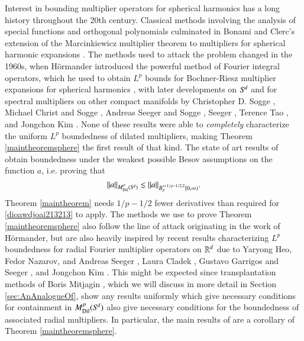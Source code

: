 Interest in bounding multiplier operators for spherical harmonics has a long history throughout the 20th century. Classical methods involving the analysis of special functions and orthogonal polynomials culminated in Bonami and Clerc's extension of the Marcinkiewicz multiplier theorem to multipliers for spherical harmonic expansions \cite{BonamiClerc}. The methods used to attack the problem changed in the 1960s, when H\"{o}rmander introduced the powerful method of Fourier integral operators, which he used to obtain $L^p$ bounds for Bochner-Riesz multiplier expansions for spherical harmonics \cite{HormanderRiesz}, with later developments on ${S}^{\!{d}}$ and for spectral multipliers on other compact manifolds by Christopher D. Sogge \cite{SoggeSpectralClusters,SoggeRieszMeans,SoggeSphericalHarmonics}, Michael Christ and Sogge \cite{ChristandSogge}, Andreas Seeger and Sogge \cite{SeegerSoggeBochnerRiesz}, Seeger \cite{SeegerEndpointEstimatesMultipliers}, Terence Tao \cite{Tao}, and Jongchon Kim \cite{KimSpectral}. None of these results were able to \emph{completely} characterize the uniform $L^p$ boundedness of dilated multipliers, making Theorem \ref{maintheoremsphere} the first result of that kind. The state of art results of \cite{KimSpectral} obtain boundedness under the weakest possible Besov assumptions on the function $a$, i.e. proving that
%
\begin{equation} \label{dioawdjoai213213}
  \| a \|_{M^p_{\text{Dil}}({S}^{\!{d}})} \lesssim \| a \|_{\dot{B}^{s+1/p - 1/2,2}_p[0,\infty)}.
\end{equation}
%
Theorem \ref{maintheorem} needs $1/p - 1/2$ fewer derivatives than required for \eqref{dioawdjoai213213} to apply. The methods we use to prove Theorem \ref{maintheoremsphere} also follow the line of attack originating in the work of H\"{o}rmander, but are also heavily inspired by recent results characterizing $L^p$ boundedness for radial Fourier multiplier operators on $\operatorname{\mathbb{R}}^d$ due to Yaryong Heo, Fedor Nazarov, and Andreas Seeger \cite{HeoandNazarovandSeeger2}, Laura Cladek \cite{Cladek}, Gustavo Garrigos and Seeger \cite{GarrigosandSeeger}, and Jongchon Kim \cite{KimQuasiradial}. This might be expected since transplantation methods of Boris Mitjagin \cite{Mitjagin}, which we will discuss in more detail in Section \ref{sec:AnAnalogueOf}, show any results uniformly which give necessary conditions for containment in $M^p_{\text{Dil}}({S}^{\!{d}})$ also give necessary conditions for the boundedness of associated radial multipliers. In particular, the main results of \cite{HeoandNazarovandSeeger} are a corollary of Theorem \ref{maintheoremsphere}.

